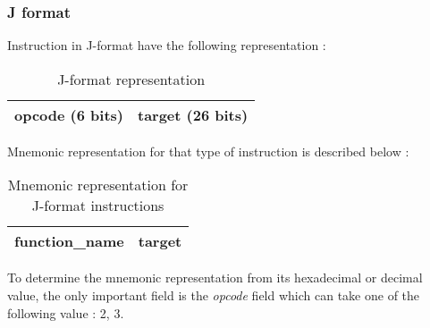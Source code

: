 \subsubsection*{J format}

	Instruction in J-format have the following representation :
	
	\begin{table}[H]
		\centering
		\begin{tabular}{|c|c|}
			\hline
			opcode (6 bits) & target (26 bits)\\
			\hline
		\end{tabular}
		\caption{J-format representation}
	\end{table}
	
	Mnemonic representation for that type of instruction is described below :
	\begin{table}[H]
		\centering
		\begin{tabular}{|c|c|}
			\hline
			function\_name & target\\
			\hline
		\end{tabular}
		\caption{Mnemonic representation for J-format instructions}
	\end{table}
	
	To determine the mnemonic representation from its hexadecimal or decimal value, the only important field is the \textit{opcode} field which can take one of the following value : 2, 3.